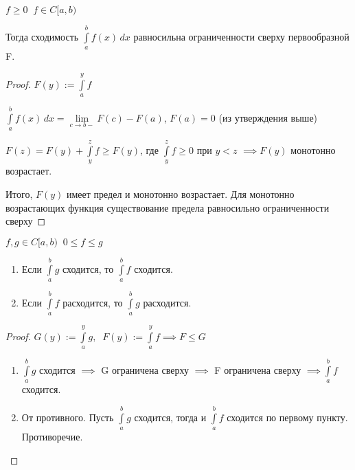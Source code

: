 
\begin{theorem} \thmslashn

    $f \ge 0 \;\; f \in C[a,b)$

    Тогда сходимость $\int\limits_a^b f(x) \, dx$ равносильна ограниченности сверху первообразной F.

\end{theorem}

\begin{proof} \thmslashn

    $F(y) := \int\limits_{a}^{y} f$

    $\int\limits_a^b f(x) \, dx =\lim\limits_{c \to b-} F(c) - F(a)$, $F(a) = 0$ (из утверждения выше)

    $F(z) = F(y) + \int\limits_{y}^{z} f \ge F(y)$, где $\int\limits_{y}^{z} f \ge 0$ при $y < z$ $\implies F(y)$ монотонно возрастает.

    Итого, $F(y)$ имеет предел и монотонно возрастает. Для монотонно возрастающих функция существование предела равносильно ограниченности сверху

\end{proof}

\begin{consequence} \thmslashn

    $f,g \in C[a,b)  \;\; 0 \le f \le g $
    \begin{enumerate}
    
        \item Если $\int\limits_{a}^{b} g$ сходится, то $\int\limits_{a}^{b} f$ сходится.
        
        \item Если $\int\limits_{a}^{b} f$ расходится, то $\int\limits_{a}^{b} g$ расходится.
        
    \end{enumerate}

\end{consequence}

\begin{proof} \thmslashn

    $G(y) := \int\limits_{a}^{y} g, \;\; F(y) := \int\limits_{a}^{y} f \implies F \le G$  
    \begin{enumerate}
    
        \item $\int\limits_{a}^{b} g$ сходится $\implies$ G ограничена сверху $\implies$ F ограничена сверху $\implies \int\limits_{a}^{b} f$ сходится.
        
        \item От противного. Пусть $\int\limits_{a}^{b} g$ сходится, тогда и $\int\limits_{a}^{b} f$ сходится по первому пункту. Противоречие.
        
    \end{enumerate}

\end{proof}

